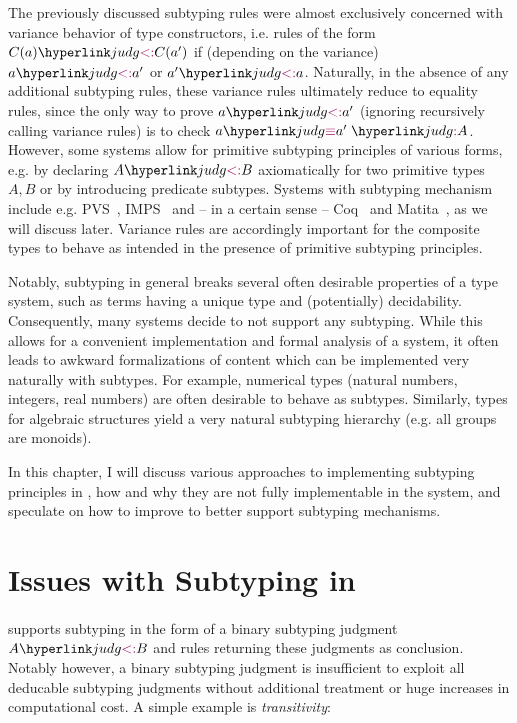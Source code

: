 The previously discussed subtyping rules were almost exclusively concerned with variance behavior of type constructors, i.e. rules of the form $\subtp{C(a)}{C(a')}$ if (depending on the variance) $\subtp a{a'}$ or $\subtp{a'}a$. Naturally, in the absence of any additional subtyping rules, these variance rules ultimately reduce to equality rules, since the only way to prove $\subtp a{a'}$ (ignoring recursively calling variance rules) is to check $\judgeq a{a'}A$. However, some systems allow for primitive subtyping principles of various forms, e.g. by declaring $\subtp AB$ axiomatically for two primitive types $A,B$ or by introducing predicate subtypes. Systems with subtyping mechanism include e.g. PVS~\cite{pvs}, IMPS~\cite{imps} and -- in a certain sense -- Coq~\cite{coq} and Matita~\cite{matita}, as we will discuss later. Variance rules are accordingly important for the composite types to behave as intended in the presence of primitive subtyping principles.

Notably, subtyping in general breaks several often desirable properties of a type system, such as terms having a unique type and (potentially) decidability. Consequently, many systems decide to not support any subtyping. While this allows for a convenient implementation and formal analysis of a system, it often leads to awkward formalizations of content which can be implemented very naturally with subtypes. For example, numerical types (natural numbers, integers, real numbers) are often desirable to behave as subtypes. Similarly, types for algebraic structures yield a very natural subtyping hierarchy (e.g. all groups are monoids).

In this chapter, I will discuss various approaches to implementing subtyping principles in \mmt, how and why they are not fully implementable in the system, and speculate on how to improve \mmt to better support subtyping mechanisms.

\section{Issues with Subtyping in \mmt}

\paragraph{} \mmt supports subtyping in the form of a binary subtyping judgment $\subtp AB$ and rules returning these judgments as conclusion. Notably however, a binary subtyping judgment is insufficient to exploit all deducable subtyping judgments without additional treatment or huge increases in computational cost. A simple example is \emph{transitivity}: %

